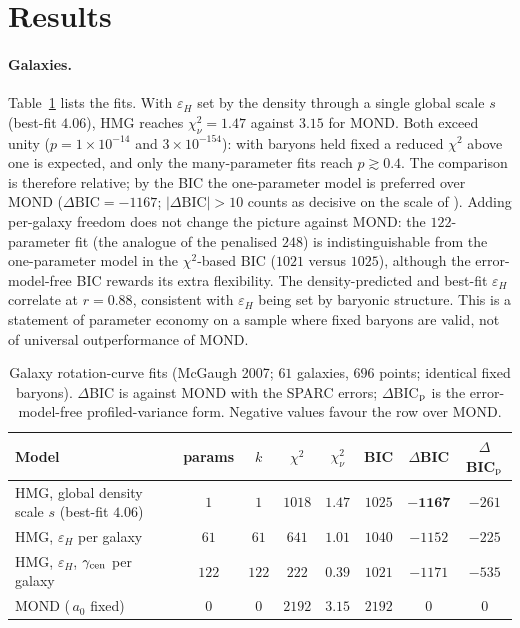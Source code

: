 \documentclass[11pt]{article}
\begin{document}
\section{Results}
\label{sec:results}

\paragraph{Galaxies.}
Table~\ref{tab:gal} lists the fits. With $\varepsilon_H$ set by the density through
a single global scale $s$ (best-fit $4.06$), HMG reaches $\chi^2_\nu=1.47$ against
$3.15$ for MOND. Both exceed unity ($p=1\times10^{-14}$ and $3\times10^{-154}$):
with baryons held fixed a reduced $\chi^2$ above one is expected, and only the
many-parameter fits reach $p\gtrsim0.4$. The comparison is therefore relative; by
the BIC the one-parameter model is preferred over MOND ($\Delta\mathrm{BIC}=-1167$;
$|\Delta\mathrm{BIC}|>10$ counts as decisive on the scale of \cite{KassRaftery1995}).
Adding per-galaxy freedom does not change the picture against MOND: the
$122$-parameter fit (the analogue of the penalised $248$) is indistinguishable from
the one-parameter model in the $\chi^2$-based BIC ($1021$ versus $1025$), although
the error-model-free BIC rewards its extra flexibility. The density-predicted and
best-fit $\varepsilon_H$ correlate at $r=0.88$, consistent with $\varepsilon_H$
being set by baryonic structure. This is a statement of parameter economy on a
sample where fixed baryons are valid, not of universal outperformance of MOND.

\begin{table}[htbp]
\centering
\caption{Galaxy rotation-curve fits (McGaugh 2007; $61$ galaxies, $696$ points;
identical fixed baryons). $\Delta$BIC is against MOND with the SPARC errors;
$\Delta$BIC$_{\rm p}$ is the error-model-free profiled-variance form. Negative
values favour the row over MOND.}
\label{tab:gal}
\small\setlength{\tabcolsep}{4pt}
\begin{tabular}{lccccccc}
\toprule
Model & params & $k$ & $\chi^2$ & $\chi^2_\nu$ & BIC & $\Delta$BIC & $\Delta$BIC$_{\rm p}$ \\
\midrule
HMG, global density scale $s$ (best-fit $4.06$) & $1$ & $1$  & $1018$ & $1.47$ & $1025$ & $\mathbf{-1167}$ & $-261$ \\
HMG, $\varepsilon_H$ per galaxy      & $61$ & $61$ & $641$  & $1.01$ & $1040$ & $-1152$ & $-225$ \\
HMG, $\varepsilon_H$, $\gamma_{\rm cen}$ per galaxy & $122$ & $122$ & $222$ & $0.39$ & $1021$ & $-1171$ & $-535$ \\
MOND (\,$a_0$ fixed) & $0$ & $0$ & $2192$ & $3.15$ & $2192$ & $0$ & $0$ \\
\bottomrule
\end{tabular}
\end{table}
\end{document}
